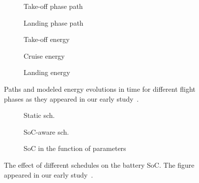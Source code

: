 \spr
\begin{figure}[p!]
  \centering
  \selectfont
  \footnotesize
  \begin{subfigure}[c]{0.49\textwidth}
    \centering
    
    \caption{Take-off phase path}
    \label{fig:takeoff-path}
    \vspace{1ex}
  \end{subfigure}
  \begin{subfigure}[c]{0.49\textwidth}
    \centering
    
    \vspace*{2.4ex}
    \caption{Landing phase path}
    \label{fig:landing-path}
    \vspace{1.4ex}
  \end{subfigure}
  \quad
  \begin{subfigure}[t]{0.362\textwidth}
    \centering
    
    \vspace{-2ex}
    \caption{Take-off energy}
    \label{fig:takeoff-energy}
  \end{subfigure}
  \begin{subfigure}[t]{0.312\textwidth}
    \centering
    
    \vspace{-2ex}
    \caption{Cruise energy}
    \label{fig:cruise-energy}
  \end{subfigure}
  \begin{subfigure}[t]{0.30\textwidth}
    \centering
    
    \vspace{-2ex}
    \caption{Landing energy}
    \label{fig:landing-energy}
  \end{subfigure}
  \caption[Paths and modeled energy evolutions in time for different flight phases]{Paths and modeled energy evolutions in time for different flight phases as they appeared in our early study~\citep{seewald2020mechanical}.}
  \label{fig:path-energy}
\end{figure}
\begin{figure}[p!]
  \centering
  \selectfont
  \footnotesize
  \begin{subfigure}[t]{0.31\textwidth}
    \centering
    
    \caption{Static sch.}
    \label{fig:soc-configuration}
  \end{subfigure}
  \begin{subfigure}[t]{0.22\textwidth}
    \centering
    
    \vspace{-2.8ex}
    \caption{SoC-aware sch.}
    \label{fig:soc-schedule}
  \end{subfigure}
  \begin{subfigure}[t]{0.457\textwidth}
    \centering
    
    \vspace{-.62ex}
    \caption{SoC in the function of parameters}
    \label{fig:soc-plot}
  \end{subfigure}
  \caption[The effect of different schedules on the battery SoC]{The effect of different schedules on the battery SoC. The figure appeared in our early study~\citep{seewald2020mechanical}.}
  \label{fig:soc-evolution}
\end{figure}
\epr


